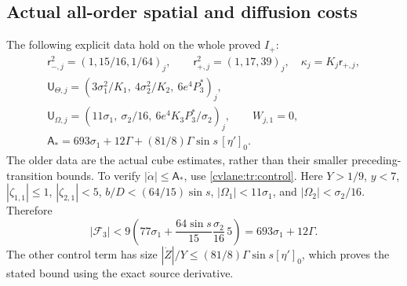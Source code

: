 \subsection{Actual all-order spatial and diffusion costs}

The following explicit data hold on the whole proved $I_+$:
\begin{equation}\label{cvlane:trls:normdata}
 \begin{gathered}
 \mathsf r_{-,j}^2=(1,15/16,1/64)_j,\qquad
 \mathsf r_{+,j}^2=(1,17,39)_j,\quad
 \mathsf\kappa_j=K_j\mathsf r_{+,j},\\
 \mathsf U_{\Theta,j}=
 (3\sigma_1^2/K_1,\ 4\sigma_2^2/K_2,\ 6e^4P_3^*)_j,\\
 \mathsf U_{\Omega,j}=
 (11\sigma_1,\ \sigma_2/16,\ 6e^4K_3P_3^*/\sigma_2)_j,
 \qquad W_{j,1}=0,\\
 \mathsf A_*=693\sigma_1+12\Gamma
           +(81/8)\Gamma\sin s\,[\eta']_0.
 \end{gathered}
\end{equation}
The older data are the actual cube estimates, rather than their
smaller preceding-transition bounds. To verify
$|\dot\alpha|\leq\mathsf A_*$, use \eqref{cvlane:tr:control}.
Here $Y>1/9$, $y<7$, $|\zeta_{1,1}|\leq1$,
$|\zeta_{2,1}|<5$, $b/D<(64/15)\sin s$,
$|\Omega_1|<11\sigma_1$, and
$|\Omega_2|<\sigma_2/16$. Therefore
\[
 |\mathcal F_3|
 <9\left(77\sigma_1+
   \frac{64\sin s}{15}\frac{\sigma_2}{16}\,5\right)
 =693\sigma_1+12\Gamma.
\]
The other control term has size
$|\dot Z|/Y\leq(81/8)\Gamma\sin s[\eta']_0$,
which proves the stated bound using the exact source derivative.

